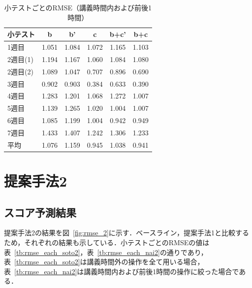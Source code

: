 \documentclass[a4paper,12pt]{ltjsreport}
\begin{document}
\begin{table}[tbp]
  \centering
  \caption{小テストごとのRMSE（講義時間内および前後1時間）}
  \label{tb:rmse_each_nai}
  \begin{tabular}{l||c|c|c|c|c}
    小テスト & b & b' & c & b+c' & b+c \\ \hline\hline
    1週目 & 1.051 & 1.084 & 1.072 & 1.165 & 1.103 \\ \hline
    2週目(1)  & 1.194 & 1.167 & 1.060 & 1.084 & 1.080 \\ \hline
    2週目(2)  & 1.089 & 1.047 & 0.707 & 0.896 & 0.690 \\ \hline
    3週目 & 0.902 & 0.903 & 0.384 & 0.633 & 0.390 \\ \hline
    4週目 & 1.283 & 1.201 & 1.068 & 1.272 & 1.007 \\ \hline
    5週目 & 1.139 & 1.265 & 1.020 & 1.004 & 1.007 \\ \hline
    6週目 & 1.085 & 1.199 & 1.004 & 0.942 & 0.949 \\ \hline
    7週目 & 1.433 & 1.407 & 1.242 & 1.306 & 1.233 \\ \hline\hline
    平均 & 1.076 & 1.159 & 0.945 & 1.038 & 0.941 \\ \hline
  \end{tabular}
\end{table}


\section{提案手法2}\label{sec:kekka2}

\subsection{スコア予測結果}
提案手法2の結果を図~\ref{fig:rmse_2}に示す．ベースライン，提案手法1と比較するため，それぞれの結果も示している．小テストごとのRMSEの値は表~\ref{tb:rmse_each_soto2}，表~\ref{tb:rmse_each_nai2}の通りであり，表~\ref{tb:rmse_each_soto2}は講義時間外の操作を全て用いる場合，表~\ref{tb:rmse_each_nai2}は講義時間内および前後1時間の操作に絞った場合である．
\end{document}
